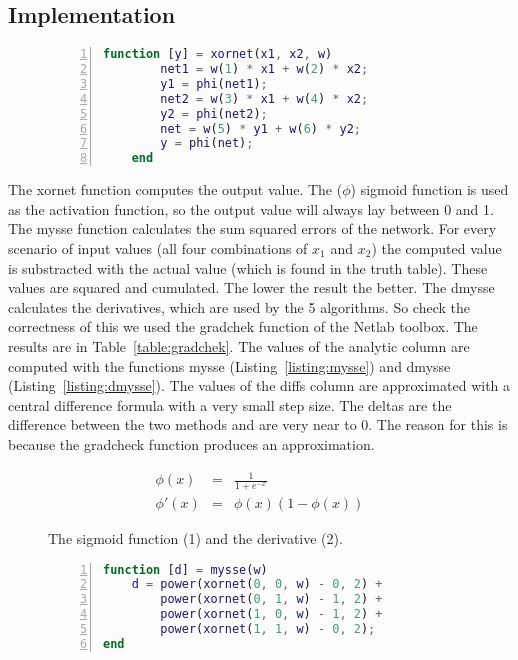 \documentclass{article}
\begin{document}
\subsection{Implementation}

\begin{figure}[h]
	\begin{lstlisting}[caption={The computation of the output value, based on the input values and the weights.}, captionpos=b, language=matlab, numbers=left, tabsize=4, frame=single, basicstyle=\footnotesize]
	function [y] = xornet(x1, x2, w)
		net1 = w(1) * x1 + w(2) * x2;
	 	y1 = phi(net1);
		net2 = w(3) * x1 + w(4) * x2;
	 	y2 = phi(net2);
		net = w(5) * y1 + w(6) * y2;
	 	y = phi(net);
	end
	\end{lstlisting}
\end{figure}

The xornet function computes the output value. The ($\phi$) sigmoid function is used as the activation function, so the output value will always lay between 0 and 1. The mysse function calculates the sum squared errors of the network. For every scenario of input values (all four combinations of $x_1$ and $x_2$) the computed value is substracted with the actual value (which is found in the truth table). These values are squared and cumulated. The lower the result the better. The dmysse calculates the derivatives, which are used by the 5 algorithms. So check the correctness of this we used the gradchek function of the Netlab toolbox. The results are in Table~\ref{table:gradchek}. The values of the analytic column are computed with the functions mysse (Listing~\ref{listing:mysse}) and dmysse (Listing~\ref{listing:dmysse}). The values of the diffs column are approximated with a central difference formula with a very small step size. The deltas are the difference between the two methods and are very near to 0. The reason for this is because the gradcheck function produces an approximation. 

\begin{figure}
	\centering
	\begin{eqnarray}
	 \phi(x) & = & \frac{1}{1 + e^{-x}} \\
	   \phi'(x) & = & \phi(x)(1 - \phi(x))
	\end{eqnarray}
	\caption{The sigmoid function (1) and the derivative (2).}
\end{figure}

\begin{figure}
	\begin{lstlisting}[caption={The calculation of the sum squared error of the weights.}, label={listing:mysse}, captionpos=b, language=matlab, numbers=left, tabsize=4, frame=single, basicstyle=\footnotesize, breaklines=true]
function [d] = mysse(w)
	d = power(xornet(0, 0, w) - 0, 2) + 
		power(xornet(0, 1, w) - 1, 2) + 
		power(xornet(1, 0, w) - 1, 2) + 
		power(xornet(1, 1, w) - 0, 2);
end
	\end{lstlisting}
\end{figure}
\end{document}
